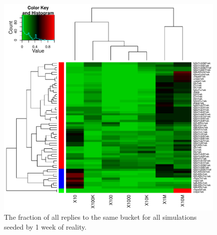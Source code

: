 \documentclass[10pt,oneside]{memoir}
\begin{document}
\begin{Spacing}{2}
\begin{figure}
\begin{center}
    \includegraphics{figures/crop/heatmap-b2br-self-rel-medians-1wk}
    \caption{The fraction of all replies to the same bucket for all simulations seeded by 1 week of reality.}
    \label{figure:heatmap-b2br-self-rel-medians-1wk}
\end{center}
\end{figure}


\end{Spacing}
\end{document}

